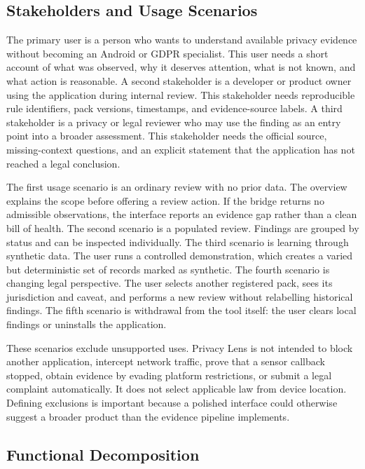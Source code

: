 \subsection{Stakeholders and Usage Scenarios}

The primary user is a person who wants to understand available privacy evidence without becoming an Android or GDPR specialist. This user needs a short account of what was observed, why it deserves attention, what is not known, and what action is reasonable. A second stakeholder is a developer or product owner using the application during internal review. This stakeholder needs reproducible rule identifiers, pack versions, timestamps, and evidence-source labels. A third stakeholder is a privacy or legal reviewer who may use the finding as an entry point into a broader assessment. This stakeholder needs the official source, missing-context questions, and an explicit statement that the application has not reached a legal conclusion.

The first usage scenario is an ordinary review with no prior data. The overview explains the scope before offering a review action. If the bridge returns no admissible observations, the interface reports an evidence gap rather than a clean bill of health. The second scenario is a populated review. Findings are grouped by status and can be inspected individually. The third scenario is learning through synthetic data. The user runs a controlled demonstration, which creates a varied but deterministic set of records marked as synthetic. The fourth scenario is changing legal perspective. The user selects another registered pack, sees its jurisdiction and caveat, and performs a new review without relabelling historical findings. The fifth scenario is withdrawal from the tool itself: the user clears local findings or uninstalls the application.

These scenarios exclude unsupported uses. Privacy Lens is not intended to block another application, intercept network traffic, prove that a sensor callback stopped, obtain evidence by evading platform restrictions, or submit a legal complaint automatically. It does not select applicable law from device location. Defining exclusions is important because a polished interface could otherwise suggest a broader product than the evidence pipeline implements.

\subsection{Functional Decomposition}

